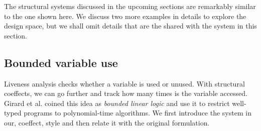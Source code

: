 The structural systems discussed in the upcoming sections are remarkably similar to the one
shown here. We discuss two more examples in details to explore the design space, but we shall
omit details that are the shared with the system in this section.


\subsection{Bounded variable use}
\label{sec:applications-struct-bll}

Liveness analysis checks whether a variable is used or unused. With structural coeffects, we can go
further and track how many times is the variable accessed. Girard et al. \cite{logic-bounded} coined
this idea as \emph{bounded linear logic} and use it to restrict well-typed programs to 
polynomial-time algorithms. We first introduce the system in our, coeffect, style and then 
relate it with the original formulation.


